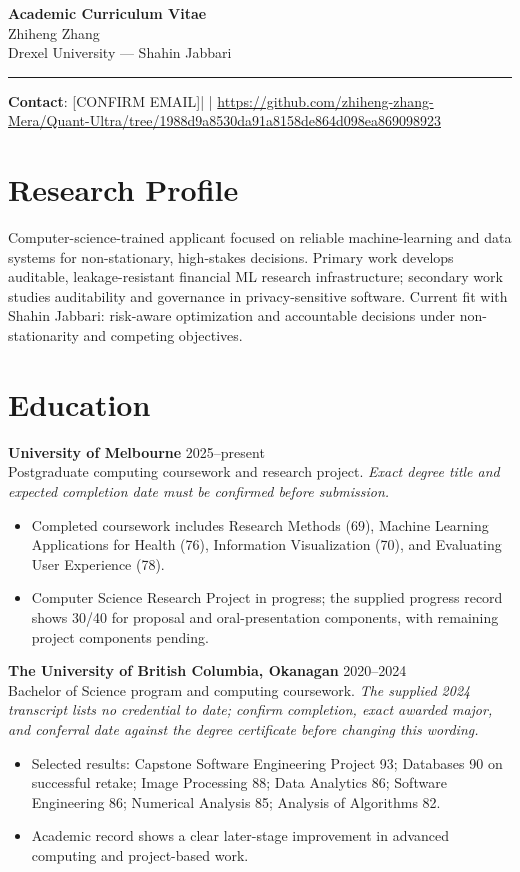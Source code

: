 \documentclass[11pt]{article}
\newcommand{\ApplicantName}{Zhiheng Zhang}
\newcommand{\ApplicantEmail}{[CONFIRM EMAIL]}
\newcommand{\ApplicantPhone}{[CONFIRM PHONE]}
\newcommand{\ApplicantGitHub}{\url{https://github.com/zhiheng-zhang-Mera/Quant-Ultra/tree/1988d9a8530da91a8158de864d098ea869098923}}
\begin{document}
\begin{center}
{\LARGE\bfseries Academic Curriculum Vitae}\\[0.25em]
{\large \ApplicantName}\\
Drexel University --- Shahin Jabbari
\end{center}
\vspace{0.35em}\hrule\vspace{0.65em}

\textbf{Contact}: \ApplicantEmail\quad | \quad \ApplicantPhone\quad | \quad \ApplicantGitHub

\section*{Research Profile}
Computer-science-trained applicant focused on reliable machine-learning and data systems for non-stationary, high-stakes decisions. Primary work develops auditable, leakage-resistant financial ML research infrastructure; secondary work studies auditability and governance in privacy-sensitive software. Current fit with Shahin Jabbari: risk-aware optimization and accountable decisions under non-stationarity and competing objectives.

\section*{Education}
\textbf{University of Melbourne} \hfill 2025--present\\
Postgraduate computing coursework and research project. \textit{Exact degree title and expected completion date must be confirmed before submission.}
\begin{itemize}
\item Completed coursework includes Research Methods (69), Machine Learning Applications for Health (76), Information Visualization (70), and Evaluating User Experience (78).
\item Computer Science Research Project in progress; the supplied progress record shows 30/40 for proposal and oral-presentation components, with remaining project components pending.
\end{itemize}

\textbf{The University of British Columbia, Okanagan} \hfill 2020--2024\\
Bachelor of Science program and computing coursework. \textit{The supplied 2024 transcript lists no credential to date; confirm completion, exact awarded major, and conferral date against the degree certificate before changing this wording.}
\begin{itemize}
\item Selected results: Capstone Software Engineering Project 93; Databases 90 on successful retake; Image Processing 88; Data Analytics 86; Software Engineering 86; Numerical Analysis 85; Analysis of Algorithms 82.
\item Academic record shows a clear later-stage improvement in advanced computing and project-based work.
\end{itemize}
\end{document}

